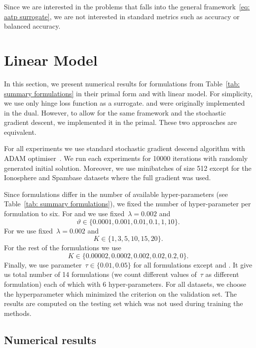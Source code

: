 Since we are interested in the problems that falls into the general framework~\eqref{eq: aatp surrogate}, we are not interested in standard metrics such as accuracy or balanced accuracy.

\section{Linear Model}\label{sec:num1}

In this section, we present numerical results for formulations from Table~\ref{tab: summary formulations} in their primal form and with linear model. For simplicity, we use only hinge loss function as a surrogate. \TopPush and \tauFPL were originally implemented in the dual. However, to allow for the same framework and the stochastic gradient descent, we implemented it in the primal. These two approaches are equivalent.

For all experiments we use standard stochastic gradient descend algorithm with ADAM
optimiser~\cite{kingma2014adam}. We run each experiments for 10000 iterations with randomly generated initial
solution. Moreover, we use minibatches of size 512 except for the Ionosphere and Spambase
datasets where the full gradient was used.

Since formulations differ in the number of available hyper-parameters (see Table~\ref{tab: summary formulations}), we fixed the number of hyper-parameter per formulation to six. For \PatMat and \PatMatNP we use fixed~$\lambda = 0.002$ and
\begin{equation*}
  \vartheta \in \{0.0001, 0.001, 0.01, 0.1, 1, 10\}.
\end{equation*}
For \TopPushK we use fixed~$\lambda = 0.002$ and
\begin{equation*}
  K \in \{1, 3, 5, 10, 15, 20\}.
\end{equation*}
For the rest of the formulations we use
\begin{equation*}
  K \in \{0.00002, 0.0002, 0.002, 0.02, 0.2, 0\}.
\end{equation*}
Finally, we use parameter~$\tau \in \{0.01, 0.05\}$ for all formulations except \TopPush and \TopPushK. It give us total number of 14 formulations (we count different values of~$\tau$ as different formulation) each of which with 6 hyper-parameters. For all datasets, we choose the hyperparameter which minimized the criterion on the validation set. The results are computed on the testing set which was not used during training the methods.

\subsection{Numerical results}

